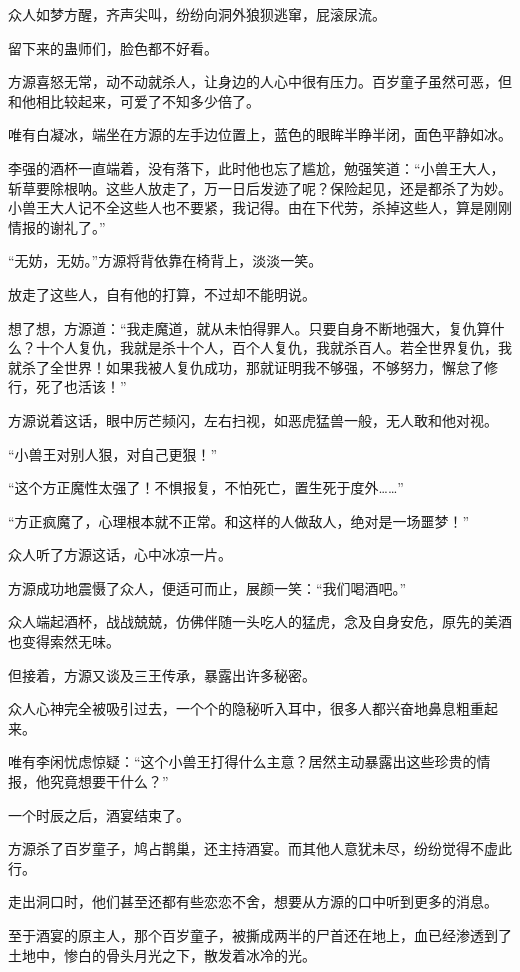 \begin{this_body}
众人如梦方醒，齐声尖叫，纷纷向洞外狼狈逃窜，屁滚尿流。

留下来的蛊师们，脸色都不好看。

方源喜怒无常，动不动就杀人，让身边的人心中很有压力。百岁童子虽然可恶，但和他相比较起来，可爱了不知多少倍了。

唯有白凝冰，端坐在方源的左手边位置上，蓝色的眼眸半睁半闭，面色平静如冰。

李强的酒杯一直端着，没有落下，此时他也忘了尴尬，勉强笑道：“小兽王大人，斩草要除根呐。这些人放走了，万一日后发迹了呢？保险起见，还是都杀了为妙。小兽王大人记不全这些人也不要紧，我记得。由在下代劳，杀掉这些人，算是刚刚情报的谢礼了。”

“无妨，无妨。”方源将背依靠在椅背上，淡淡一笑。

放走了这些人，自有他的打算，不过却不能明说。

想了想，方源道：“我走魔道，就从未怕得罪人。只要自身不断地强大，复仇算什么？十个人复仇，我就是杀十个人，百个人复仇，我就杀百人。若全世界复仇，我就杀了全世界！如果我被人复仇成功，那就证明我不够强，不够努力，懈怠了修行，死了也活该！”

方源说着这话，眼中厉芒频闪，左右扫视，如恶虎猛兽一般，无人敢和他对视。

“小兽王对别人狠，对自己更狠！”

“这个方正魔性太强了！不惧报复，不怕死亡，置生死于度外……”

“方正疯魔了，心理根本就不正常。和这样的人做敌人，绝对是一场噩梦！”

众人听了方源这话，心中冰凉一片。

方源成功地震慑了众人，便适可而止，展颜一笑：“我们喝酒吧。”

众人端起酒杯，战战兢兢，仿佛伴随一头吃人的猛虎，念及自身安危，原先的美酒也变得索然无味。

但接着，方源又谈及三王传承，暴露出许多秘密。

众人心神完全被吸引过去，一个个的隐秘听入耳中，很多人都兴奋地鼻息粗重起来。

唯有李闲忧虑惊疑：“这个小兽王打得什么主意？居然主动暴露出这些珍贵的情报，他究竟想要干什么？”

一个时辰之后，酒宴结束了。

方源杀了百岁童子，鸠占鹊巢，还主持酒宴。而其他人意犹未尽，纷纷觉得不虚此行。

走出洞口时，他们甚至还都有些恋恋不舍，想要从方源的口中听到更多的消息。

至于酒宴的原主人，那个百岁童子，被撕成两半的尸首还在地上，血已经渗透到了土地中，惨白的骨头月光之下，散发着冰冷的光。


\end{this_body}
